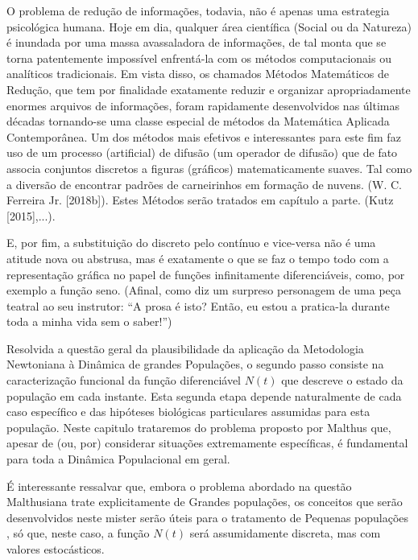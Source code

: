     O problema de redução de informações, todavia, não é apenas uma estrategia psicológica humana. Hoje em dia, qualquer área científica (Social ou da Natureza) é inundada por uma massa avassaladora de informações, de tal monta que se torna patentemente impossível enfrentá-la com os métodos computacionais ou analíticos tradicionais. Em vista disso, os chamados Métodos Matemáticos de Redução, que tem por finalidade exatamente reduzir e organizar apropriadamente enormes arquivos de informações, foram rapidamente desenvolvidos nas últimas décadas tornando-se uma classe especial de métodos da Matemática Aplicada Contemporânea. Um dos métodos mais efetivos e interessantes para este fim faz uso de um processo (artificial) de difusão (um operador de difusão) que de fato associa conjuntos discretos a figuras (gráficos) matematicamente suaves. Tal como a diversão de encontrar padrões de carneirinhos em formação de nuvens. (W. C. Ferreira Jr. [2018b]). Estes Métodos serão tratados em capítulo a parte. (Kutz [2015],...).

    E, por fim, a substituição do discreto pelo contínuo e vice-versa não é uma atitude nova ou abstrusa, mas é exatamente o que se faz o tempo todo com a representação gráfica no papel de funções infinitamente diferenciáveis, como, por exemplo a função seno. (Afinal, como diz um surpreso personagem de uma peça teatral ao seu instrutor: ``A prosa é isto? Então, eu estou a pratica-la durante toda a minha vida sem o saber!'')
    
    Resolvida a questão geral da plausibilidade da aplicação da Metodologia Newtoniana à Dinâmica de grandes Populações, o segundo passo consiste na caracterização funcional da função diferenciável \(N(t)\) que descreve o estado da população em cada instante. Esta segunda etapa depende naturalmente de cada caso específico e das hipóteses biológicas particulares assumidas para esta população. Neste capitulo trataremos do problema proposto por Malthus que, apesar de (ou, por) considerar situações extremamente específicas, é fundamental para toda a Dinâmica Populacional em geral.

    É interessante ressalvar que, embora o problema abordado na questão Malthusiana trate explicitamente de Grandes populações, os conceitos que serão desenvolvidos neste mister serão úteis para o tratamento de Pequenas populações , só que, neste caso, a função \(N(t)\) será assumidamente discreta, mas com valores estocásticos.




